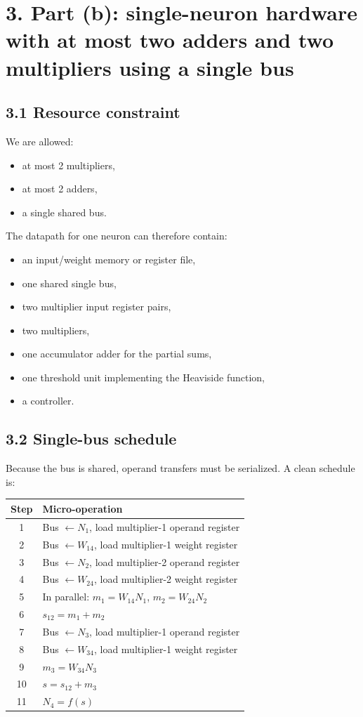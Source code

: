 \documentclass[11pt,a4paper]{article}
\begin{document}
\section*{3. Part (b): single-neuron hardware with at most two adders and two multipliers using a single bus}
\subsection*{3.1 Resource constraint}
We are allowed:
\begin{itemize}
  \item at most 2 multipliers,
  \item at most 2 adders,
  \item a single shared bus.
\end{itemize}

The datapath for one neuron can therefore contain:
\begin{itemize}
  \item an input/weight memory or register file,
  \item one shared single bus,
  \item two multiplier input register pairs,
  \item two multipliers,
  \item one accumulator adder for the partial sums,
  \item one threshold unit implementing the Heaviside function,
  \item a controller.
\end{itemize}

\subsection*{3.2 Single-bus schedule}
Because the bus is shared, operand transfers must be serialized. A clean schedule is:
\begin{center}
\begin{tabular}{cl}
\toprule
Step & Micro-operation \\
\midrule
1 & Bus $\leftarrow N_1$, load multiplier-1 operand register \\
2 & Bus $\leftarrow W_{14}$, load multiplier-1 weight register \\
3 & Bus $\leftarrow N_2$, load multiplier-2 operand register \\
4 & Bus $\leftarrow W_{24}$, load multiplier-2 weight register \\
5 & In parallel: $m_1=W_{14}N_1$, $m_2=W_{24}N_2$ \\
6 & $s_{12}=m_1+m_2$ \\
7 & Bus $\leftarrow N_3$, load multiplier-1 operand register \\
8 & Bus $\leftarrow W_{34}$, load multiplier-1 weight register \\
9 & $m_3=W_{34}N_3$ \\
10 & $s=s_{12}+m_3$ \\
11 & $N_4=f(s)$ \\
\bottomrule
\end{tabular}
\end{center}
\end{document}
